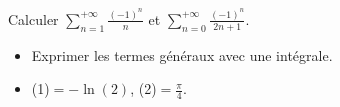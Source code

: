 \begin{exercice}
    Calculer $\displaystyle \sum_{n=1}^{+\infty} \frac{(-1)^n}{n}$ et $\displaystyle \sum_{n=0}^{+\infty} \frac{(-1)^n}{2n+1}$.
\end{exercice}

\begin{elem_sol}
    \begin{itemize}
        \item Exprimer les termes généraux avec une intégrale. 
        \item (1)$= -\ln(2)$, (2)$= \frac{\pi}{4}$.
    \end{itemize}
\end{elem_sol}
